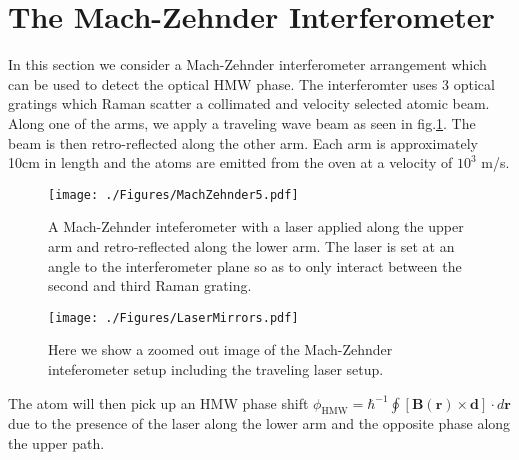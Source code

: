 \newpage
\section{The Mach-Zehnder Interferometer}

In this section we consider a Mach-Zehnder interferometer arrangement which can be used to detect the optical HMW phase.  The interferomter uses 3 optical gratings which Raman scatter a collimated and velocity selected atomic beam.  Along one of the arms, we apply a traveling wave beam as seen in fig.\ref{fig:mach}. The beam is then retro-reflected along the other arm. Each arm is approximately 10cm in length and the atoms are emitted from the oven at a velocity of $10^3$ m/s. 
\begin{figure}[htp]
\texttt{[image: ./Figures/MachZehnder5.pdf]}
\caption{A Mach-Zehnder inteferometer with a laser applied along the upper arm and retro-reflected along the lower arm.  The laser is set at an angle to the interferometer plane so as to only interact between the second and third Raman grating.} 
\label{fig:mach}
\end{figure}

\begin{figure}[htp]
\texttt{[image: ./Figures/LaserMirrors.pdf]}
\caption{Here we show a zoomed out image of the Mach-Zehnder inteferometer setup including the traveling laser setup.} 
\label{fig:mach2}
\end{figure}

The atom will then pick up an HMW phase shift $ \phi_{\mathrm{HMW}} = \hbar^{-1} \oint [\mathbf{B}(\mathbf{r}) \times \mathbf {d}] \cdot d \mathbf r $ due to the presence of the laser along the lower arm and the opposite phase along the upper path.  

